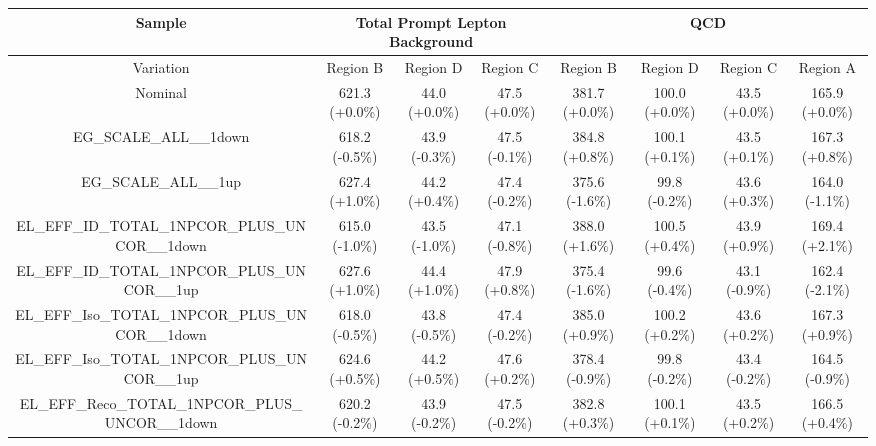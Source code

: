 %
%
\begin{table}[htbp!]
\begin{tiny}
\begin{center}
\begin{tabular}{c|c|c|c||c|c|c|c}
Sample                                                          &\multicolumn{3}{c||}{Total Prompt Lepton Background}      &\multicolumn{4}{c}{QCD}                                                  \\
\hline  
Variation                                                       & Region B       & Region D         & Region C           & Region B        & Region D         & Region C          & Region A         \\ 
\hline  
Nominal                                                         & 621.3     (+0.0\%) & 44.0      (+0.0\%) & 47.5      (+0.0\%) & 381.7     (+0.0\%) & 100.0     (+0.0\%) & 43.5      (+0.0\%) & 165.9     (+0.0\%) \\ 
\hline
EG\_SCALE\_ALL\_\_1down                                      & 618.2     (-0.5\%) & 43.9      (-0.3\%) & 47.5      (-0.1\%) & 384.8     (+0.8\%) & 100.1     (+0.1\%) & 43.5      (+0.1\%) & 167.3     (+0.8\%) \\ 
EG\_SCALE\_ALL\_\_1up                                        & 627.4     (+1.0\%) & 44.2      (+0.4\%) & 47.4      (-0.2\%) & 375.6     (-1.6\%) & 99.8      (-0.2\%) & 43.6      (+0.3\%) & 164.0     (-1.1\%) \\ 
EL\_EFF\_ID\_TOTAL\_1NPCOR\_PLUS\_UNCOR\_\_1down             & 615.0     (-1.0\%) & 43.5      (-1.0\%) & 47.1      (-0.8\%) & 388.0     (+1.6\%) & 100.5     (+0.4\%) & 43.9      (+0.9\%) & 169.4     (+2.1\%) \\ 
EL\_EFF\_ID\_TOTAL\_1NPCOR\_PLUS\_UNCOR\_\_1up               & 627.6     (+1.0\%) & 44.4      (+1.0\%) & 47.9      (+0.8\%) & 375.4     (-1.6\%) & 99.6      (-0.4\%) & 43.1      (-0.9\%) & 162.4     (-2.1\%) \\ 
EL\_EFF\_Iso\_TOTAL\_1NPCOR\_PLUS\_UNCOR\_\_1down            & 618.0     (-0.5\%) & 43.8      (-0.5\%) & 47.4      (-0.2\%) & 385.0     (+0.9\%) & 100.2     (+0.2\%) & 43.6      (+0.2\%) & 167.3     (+0.9\%) \\ 
EL\_EFF\_Iso\_TOTAL\_1NPCOR\_PLUS\_UNCOR\_\_1up              & 624.6     (+0.5\%) & 44.2      (+0.5\%) & 47.6      (+0.2\%) & 378.4     (-0.9\%) & 99.8      (-0.2\%) & 43.4      (-0.2\%) & 164.5     (-0.9\%) \\ 
EL\_EFF\_Reco\_TOTAL\_1NPCOR\_PLUS\_UNCOR\_\_1down           & 620.2     (-0.2\%) & 43.9      (-0.2\%) & 47.5      (-0.2\%) & 382.8     (+0.3\%) & 100.1     (+0.1\%) & 43.5      (+0.2\%) & 166.5     (+0.4\%) \\ 

\end{tabular}
\end{center}
\end{tiny}
\end{table}
